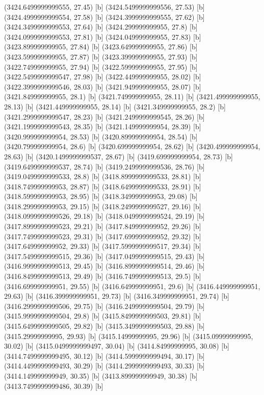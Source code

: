 {{{(3424.6499999999555, 27.45) [b] 
(3424.5499999999556, 27.53) [b] 
(3424.4999999999554, 27.58) [b] 
(3424.3999999999555, 27.62) [b] 
(3424.3499999999553, 27.64) [b] 
(3424.299999999955, 27.8) [b] 
(3424.0999999999553, 27.81) [b] 
(3424.049999999955, 27.83) [b] 
(3423.899999999955, 27.84) [b] 
(3423.649999999955, 27.86) [b] 
(3423.599999999955, 27.87) [b] 
(3423.399999999955, 27.93) [b] 
(3422.749999999955, 27.94) [b] 
(3422.599999999955, 27.95) [b] 
(3422.5499999999547, 27.98) [b] 
(3422.449999999955, 28.02) [b] 
(3422.3999999999546, 28.03) [b] 
(3421.949999999955, 28.07) [b] 
(3421.849999999955, 28.1) [b] 
(3421.749999999955, 28.11) [b] 
(3421.499999999955, 28.13) [b] 
(3421.449999999955, 28.14) [b] 
(3421.349999999955, 28.2) [b] 
(3421.2999999999547, 28.23) [b] 
(3421.2499999999545, 28.26) [b] 
(3421.1999999999543, 28.35) [b] 
(3421.149999999954, 28.39) [b] 
(3420.999999999954, 28.53) [b] 
(3420.899999999954, 28.54) [b] 
(3420.799999999954, 28.6) [b] 
(3420.699999999954, 28.62) [b] 
(3420.499999999954, 28.63) [b] 
(3420.1499999999537, 28.67) [b] 
(3419.699999999954, 28.73) [b] 
(3419.6499999999537, 28.74) [b] 
(3419.2499999999536, 28.76) [b] 
(3419.0499999999533, 28.8) [b] 
(3418.8999999999533, 28.81) [b] 
(3418.749999999953, 28.87) [b] 
(3418.6499999999533, 28.91) [b] 
(3418.599999999953, 28.95) [b] 
(3418.349999999953, 29.08) [b] 
(3418.299999999953, 29.15) [b] 
(3418.2499999999527, 29.16) [b] 
(3418.0999999999526, 29.18) [b] 
(3418.0499999999524, 29.19) [b] 
(3417.8999999999523, 29.21) [b] 
(3417.849999999952, 29.26) [b] 
(3417.7499999999523, 29.31) [b] 
(3417.699999999952, 29.32) [b] 
(3417.649999999952, 29.33) [b] 
(3417.5999999999517, 29.34) [b] 
(3417.5499999999515, 29.36) [b] 
(3417.0499999999515, 29.43) [b] 
(3416.9999999999513, 29.45) [b] 
(3416.8999999999514, 29.46) [b] 
(3416.8499999999513, 29.49) [b] 
(3416.7499999999513, 29.5) [b] 
(3416.699999999951, 29.55) [b] 
(3416.649999999951, 29.6) [b] 
(3416.449999999951, 29.63) [b] 
(3416.399999999951, 29.73) [b] 
(3416.349999999951, 29.74) [b] 
(3416.2999999999506, 29.75) [b] 
(3416.2499999999504, 29.79) [b] 
(3415.9999999999504, 29.8) [b] 
(3415.8499999999503, 29.81) [b] 
(3415.6499999999505, 29.82) [b] 
(3415.3499999999503, 29.88) [b] 
(3415.29999999995, 29.93) [b] 
(3415.14999999995, 29.96) [b] 
(3415.09999999995, 30.02) [b] 
(3415.0499999999497, 30.04) [b] 
(3414.84999999995, 30.08) [b] 
(3414.7499999999495, 30.12) [b] 
(3414.5999999999494, 30.17) [b] 
(3414.4499999999493, 30.29) [b] 
(3414.2999999999493, 30.33) [b] 
(3414.149999999949, 30.35) [b] 
(3413.899999999949, 30.38) [b] 
(3413.7499999999486, 30.39) [b] 
}}}
